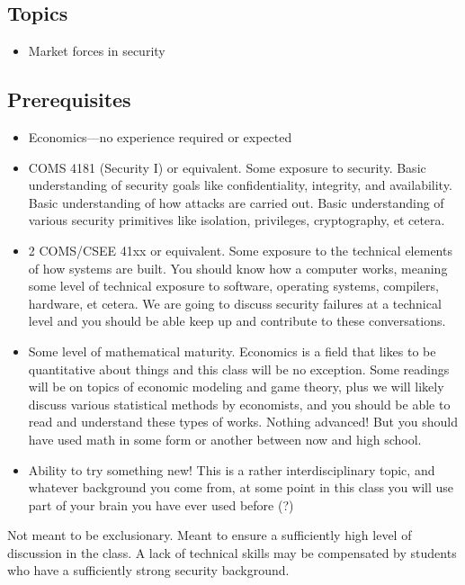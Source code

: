 \documentclass[11pt]{article}
\begin{document}
\subsection{Topics}
\begin{itemize}
    \item Market forces in security
\end{itemize}

\subsection{Prerequisites}

\begin{itemize}
    \item Economics---no experience required or expected
    \item COMS 4181 (Security I) or equivalent. Some exposure to security. Basic understanding of security goals like confidentiality, integrity, and availability. Basic understanding of how attacks are carried out. Basic understanding of various security primitives like isolation, privileges, cryptography, et cetera. 
    \item 2 COMS/CSEE 41xx or equivalent. Some exposure to the technical elements of how systems are built. You should know how a computer works, meaning some level of technical exposure to software, operating systems, compilers, hardware, et cetera. We are going to discuss security failures at a technical level and you should be able keep up and contribute to these conversations.
    \item Some level of mathematical maturity. Economics is a field that likes to be quantitative about things and this class will be no exception. Some readings will be on topics of economic modeling and game theory, plus we will likely discuss various statistical methods by economists, and you should be able to read and understand these types of works. Nothing advanced! But you should have used math in some form or another between now and high school. 
    \item Ability to try something new! This is a rather interdisciplinary topic, and whatever background you come from, at some point in this class you will use part of your brain you have ever used before (?)
\end{itemize}

Not meant to be exclusionary. Meant to ensure a sufficiently high level of discussion in the class. 
A lack of technical skills may be compensated by students who have a sufficiently strong security background.
\end{document}
